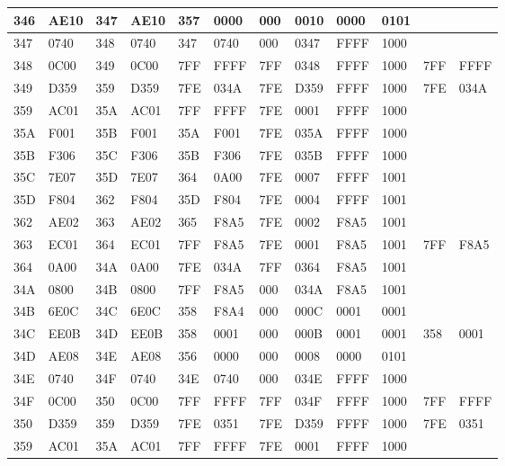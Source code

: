 \begin{table}[!ht]
\begin{tabular}{|l|l|l|l|l|l|l|l|l|l|l|l|}
        346 & AE10 & 347 & AE10 & 357 & 0000 & 000 & 0010 & 0000 & 0101 & ~ & ~ \\ \hline
        347 & 0740 & 348 & 0740 & 347 & 0740 & 000 & 0347 & FFFF & 1000 & ~ & ~ \\ \hline
        348 & 0C00 & 349 & 0C00 & 7FF & FFFF & 7FF & 0348 & FFFF & 1000 & 7FF & FFFF \\ \hline
        349 & D359 & 359 & D359 & 7FE & 034A & 7FE & D359 & FFFF & 1000 & 7FE & 034A \\ \hline
        359 & AC01 & 35A & AC01 & 7FF & FFFF & 7FE & 0001 & FFFF & 1000 & ~ & ~ \\ \hline
        35A & F001 & 35B & F001 & 35A & F001 & 7FE & 035A & FFFF & 1000 & ~ & ~ \\ \hline
        35B & F306 & 35C & F306 & 35B & F306 & 7FE & 035B & FFFF & 1000 & ~ & ~ \\ \hline
        35C & 7E07 & 35D & 7E07 & 364 & 0A00 & 7FE & 0007 & FFFF & 1001 & ~ & ~ \\ \hline
        35D & F804 & 362 & F804 & 35D & F804 & 7FE & 0004 & FFFF & 1001 & ~ & ~ \\ \hline
        362 & AE02 & 363 & AE02 & 365 & F8A5 & 7FE & 0002 & F8A5 & 1001 & ~ & ~ \\ \hline
        363 & EC01 & 364 & EC01 & 7FF & F8A5 & 7FE & 0001 & F8A5 & 1001 & 7FF & F8A5 \\ \hline
        364 & 0A00 & 34A & 0A00 & 7FE & 034A & 7FF & 0364 & F8A5 & 1001 & ~ & ~ \\ \hline
        34A & 0800 & 34B & 0800 & 7FF & F8A5 & 000 & 034A & F8A5 & 1001 & ~ & ~ \\ \hline
        34B & 6E0C & 34C & 6E0C & 358 & F8A4 & 000 & 000C & 0001 & 0001 & ~ & ~ \\ \hline
        34C & EE0B & 34D & EE0B & 358 & 0001 & 000 & 000B & 0001 & 0001 & 358 & 0001 \\ \hline
        34D & AE08 & 34E & AE08 & 356 & 0000 & 000 & 0008 & 0000 & 0101 & ~ & ~ \\ \hline
        34E & 0740 & 34F & 0740 & 34E & 0740 & 000 & 034E & FFFF & 1000 & ~ & ~ \\ \hline
        34F & 0C00 & 350 & 0C00 & 7FF & FFFF & 7FF & 034F & FFFF & 1000 & 7FF & FFFF \\ \hline
        350 & D359 & 359 & D359 & 7FE & 0351 & 7FE & D359 & FFFF & 1000 & 7FE & 0351 \\ \hline
        359 & AC01 & 35A & AC01 & 7FF & FFFF & 7FE & 0001 & FFFF & 1000 & ~ & ~ \\ \hline

\end{tabular}
\end{table}
